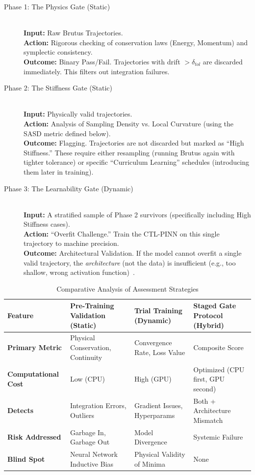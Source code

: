 \begin{description}
    \item[Phase 1: The Physics Gate (Static)] \hfill \\
    \textbf{Input:} Raw Brutus Trajectories. \\
    \textbf{Action:} Rigorous checking of conservation laws (Energy, Momentum) and symplectic consistency. \\
    \textbf{Outcome:} Binary Pass/Fail. Trajectories with drift $> \delta_{tol}$ are discarded immediately. This filters out integration failures.

    \item[Phase 2: The Stiffness Gate (Static)] \hfill \\
    \textbf{Input:} Physically valid trajectories. \\
    \textbf{Action:} Analysis of Sampling Density vs. Local Curvature (using the SASD metric defined below). \\
    \textbf{Outcome:} Flagging. Trajectories are not discarded but marked as ``High Stiffness.'' These require either resampling (running Brutus again with tighter tolerance) or specific ``Curriculum Learning'' schedules (introducing them later in training).

    \item[Phase 3: The Learnability Gate (Dynamic)] \hfill \\
    \textbf{Input:} A stratified sample of Phase 2 survivors (specifically including High Stiffness cases). \\
    \textbf{Action:} ``Overfit Challenge.'' Train the CTL-PINN on this single trajectory to machine precision. \\
    \textbf{Outcome:} Architectural Validation. If the model cannot overfit a single valid trajectory, the \textit{architecture} (not the data) is insufficient (e.g., too shallow, wrong activation function)~\cite{ref17}.
\end{description}

\begin{table}[htbp]
\centering
\caption{Comparative Analysis of Assessment Strategies}
\label{tab:assessment_strategies}
\begin{tabular}{@{}p{}p{}p{}p{}@{}}
\toprule
\textbf{Feature} & \textbf{Pre-Training Validation (Static)} & \textbf{Trial Training (Dynamic)} & \textbf{Staged Gate Protocol (Hybrid)} \\ \midrule
\textbf{Primary Metric} & Physical Conservation, Continuity & Convergence Rate, Loss Value & Composite Score \\
\textbf{Computational Cost} & Low (CPU) & High (GPU) & Optimized (CPU first, GPU second) \\
\textbf{Detects} & Integration Errors, Outliers & Gradient Issues, Hyperparams & Both + Architecture Mismatch \\
\textbf{Risk Addressed} & Garbage In, Garbage Out & Model Divergence & Systemic Failure \\
\textbf{Blind Spot} & Neural Network Inductive Bias & Physical Validity of Minima & None \\ \bottomrule
\end{tabular}
\end{table}